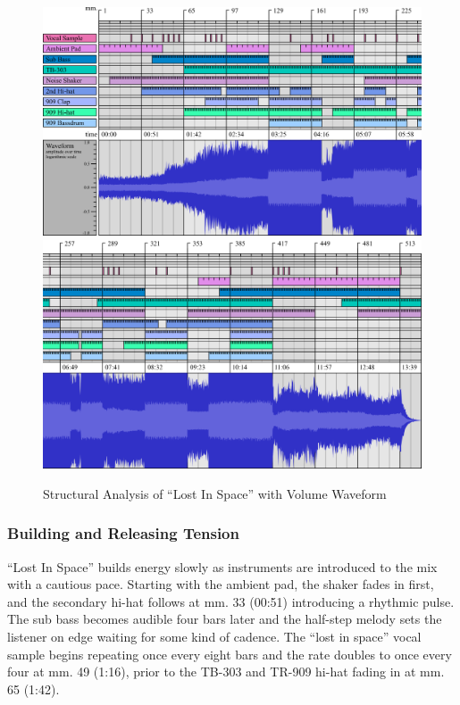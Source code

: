 \documentclass[12pt,twoside]{reedthesis}
\begin{document}
\begin{figure}
	\includegraphics[width=\columnwidth]{./Images/STRUCTURE_FINAL_L}
	\includegraphics[width=\columnwidth]{./Images/STRUCTURE_FINAL_R}
	\caption{Structural Analysis of ``Lost In Space'' with Volume Waveform}
	\label{fig:structure}
\end{figure}

\subsubsection{Building and Releasing Tension}
``Lost In Space'' builds energy slowly as instruments are introduced to the mix with a cautious pace. Starting with the ambient pad, the shaker fades in first, and the secondary hi-hat follows at mm. 33 (00:51) introducing a rhythmic pulse. The sub bass becomes audible four bars later and the half-step melody sets the listener on edge waiting for some kind of cadence. The ``lost in space'' vocal sample begins repeating once every eight bars and the rate doubles to once every four at mm. 49 (1:16), prior to the TB-303 and TR-909 hi-hat fading in at mm. 65 (1:42).
\end{document}
